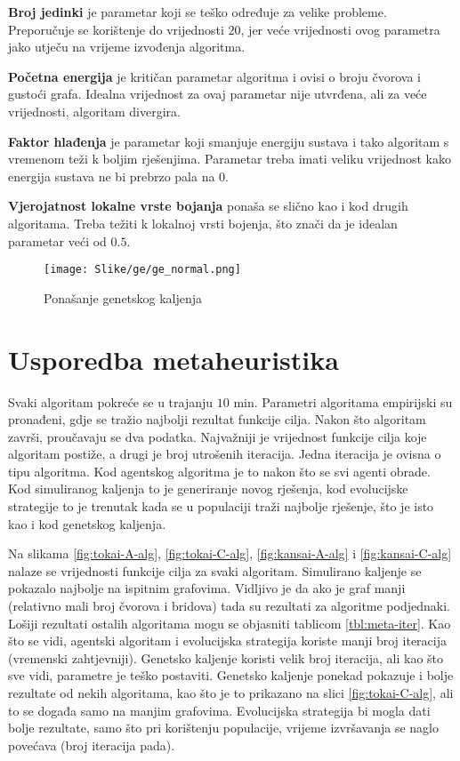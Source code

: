 \documentclass[times, utf8, diplomski, numeric]{fer}
\begin{document}
\textbf{Broj jedinki} je parametar koji se teško određuje za velike probleme. Preporučuje se korištenje do vrijednosti $20$, jer veće vrijednosti ovog parametra jako utječu na vrijeme izvođenja algoritma.

\textbf{Početna energija} je kritičan parametar algoritma i ovisi o broju čvorova i gustoći grafa. Idealna vrijednost za ovaj parametar nije utvrđena, ali za veće vrijednosti, algoritam divergira.

\textbf{Faktor hlađenja} je parametar koji smanjuje energiju sustava i tako algoritam s vremenom teži k boljim rješenjima. Parametar treba imati veliku vrijednost kako energija sustava ne bi prebrzo pala na $0$.

\textbf{Vjerojatnost lokalne vrste bojanja} ponaša se slično kao i kod drugih algoritama. Treba težiti k lokalnoj vrsti bojenja, što znači da je idealan parametar veći od $0.5$.


\begin{figure}[htb]
	\texttt{[image: Slike/ge/ge\_normal.png]}
	\caption{Ponašanje genetskog kaljenja}
	\label{fig:ge_normal}
\end{figure}


\section{Usporedba metaheuristika}

Svaki algoritam pokreće se u trajanju $10$ min. Parametri algoritama empirijski su pronađeni, gdje se tražio najbolji rezultat funkcije cilja. Nakon što algoritam završi, proučavaju se dva podatka. Najvažniji je vrijednost funkcije cilja koje algoritam postiže, a drugi je broj utrošenih iteracija. Jedna iteracija je ovisna o tipu algoritma. Kod agentskog algoritma je to nakon što se svi agenti obrade. Kod simuliranog kaljenja to je generiranje novog rješenja, kod evolucijske strategije to je trenutak kada se u populaciji traži najbolje rješenje, što je isto kao i kod genetskog kaljenja.

Na slikama \ref{fig:tokai-A-alg}, \ref{fig:tokai-C-alg}, \ref{fig:kansai-A-alg} i \ref{fig:kansai-C-alg} nalaze se vrijednosti funkcije cilja za svaki algoritam. Simulirano kaljenje se pokazalo najbolje na ispitnim grafovima. Vidljivo je da ako je graf manji (relativno mali broj čvorova i bridova) tada su rezultati za algoritme podjednaki. Lošiji rezultati ostalih algoritama mogu se objasniti tablicom \ref{tbl:meta-iter}. Kao što se vidi, agentski algoritam i evolucijska strategija koriste manji broj iteracija (vremenski zahtjevniji). Genetsko kaljenje koristi velik broj iteracija, ali kao što sve vidi, parametre je teško postaviti. Genetsko kaljenje ponekad pokazuje i bolje rezultate od nekih algoritama, kao što je to prikazano na slici \ref{fig:tokai-C-alg}, ali to se događa samo na manjim grafovima. Evolucijska strategija bi mogla dati bolje rezultate, samo što pri korištenju populacije, vrijeme izvršavanja se naglo povećava (broj iteracija pada).
\end{document}
